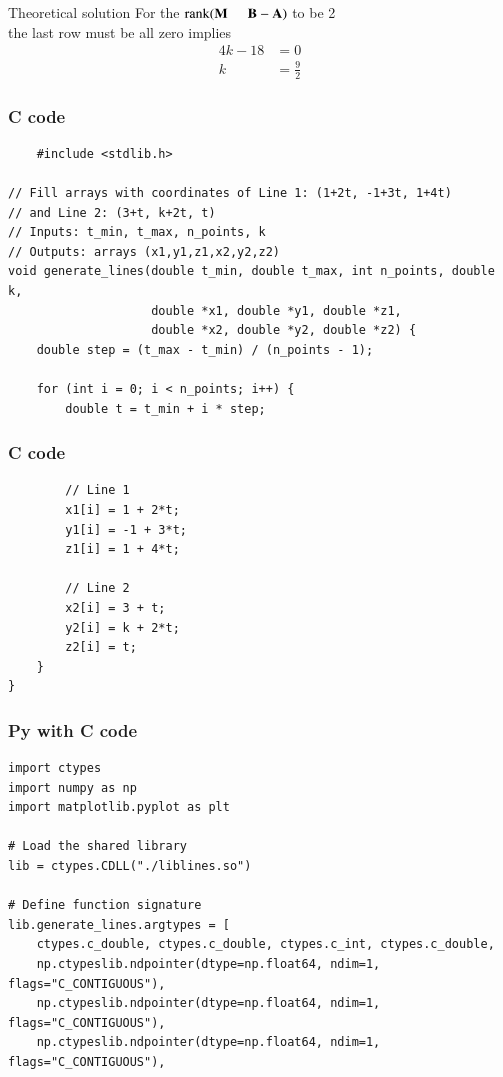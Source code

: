 \documentclass{beamer}
\begin{document}
\begin{frame}{Theoretical solution}
For the $\operatorname{rank}(\vec{M} \hspace{5mm}  \vec{B-A})$ to be 2\\
the last row must be all zero implies\\
\begin{align}
4k-18&=0\\
k&=\tfrac{9}{2}
\end{align}
\end{frame}
\begin{frame}[fragile]
    \frametitle{C code}
    \begin{lstlisting}
    #include <stdlib.h>

// Fill arrays with coordinates of Line 1: (1+2t, -1+3t, 1+4t)
// and Line 2: (3+t, k+2t, t)
// Inputs: t_min, t_max, n_points, k
// Outputs: arrays (x1,y1,z1,x2,y2,z2)
void generate_lines(double t_min, double t_max, int n_points, double k,
                    double *x1, double *y1, double *z1,
                    double *x2, double *y2, double *z2) {
    double step = (t_max - t_min) / (n_points - 1);

    for (int i = 0; i < n_points; i++) {
        double t = t_min + i * step;
        \end{lstlisting}
\end{frame}
\begin{frame}[fragile]
    \frametitle{C code}
    \begin{lstlisting}
        // Line 1
        x1[i] = 1 + 2*t;
        y1[i] = -1 + 3*t;
        z1[i] = 1 + 4*t;

        // Line 2
        x2[i] = 3 + t;
        y2[i] = k + 2*t;
        z2[i] = t;
    }
}
 \end{lstlisting}
\end{frame}
\begin{frame}[fragile]
    \frametitle{Py with C code}
    \begin{lstlisting}
import ctypes
import numpy as np
import matplotlib.pyplot as plt

# Load the shared library
lib = ctypes.CDLL("./liblines.so")

# Define function signature
lib.generate_lines.argtypes = [
    ctypes.c_double, ctypes.c_double, ctypes.c_int, ctypes.c_double,
    np.ctypeslib.ndpointer(dtype=np.float64, ndim=1, flags="C_CONTIGUOUS"),
    np.ctypeslib.ndpointer(dtype=np.float64, ndim=1, flags="C_CONTIGUOUS"),
    np.ctypeslib.ndpointer(dtype=np.float64, ndim=1, flags="C_CONTIGUOUS"),
     \end{lstlisting}
\end{frame}
\end{document}
